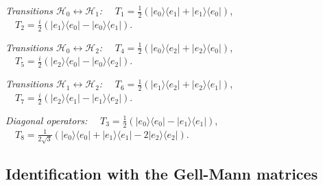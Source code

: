 \medskip
\textit{Transitions $\mathcal{H}_0\leftrightarrow\mathcal{H}_1$:}
$\quad T_1 = \tfrac{1}{2}(|e_0\rangle\langle e_1|+|e_1\rangle\langle e_0|)$,
$\quad T_2 = \tfrac{i}{2}(|e_1\rangle\langle e_0|-|e_0\rangle\langle e_1|)$.

\textit{Transitions $\mathcal{H}_0\leftrightarrow\mathcal{H}_2$:}
$\quad T_4 = \tfrac{1}{2}(|e_0\rangle\langle e_2|+|e_2\rangle\langle e_0|)$,
$\quad T_5 = \tfrac{i}{2}(|e_2\rangle\langle e_0|-|e_0\rangle\langle e_2|)$.

\textit{Transitions $\mathcal{H}_1\leftrightarrow\mathcal{H}_2$:}
$\quad T_6 = \tfrac{1}{2}(|e_1\rangle\langle e_2|+|e_2\rangle\langle e_1|)$,
$\quad T_7 = \tfrac{i}{2}(|e_2\rangle\langle e_1|-|e_1\rangle\langle e_2|)$.

\textit{Diagonal operators:}
$\quad T_3 = \tfrac{1}{2}(|e_0\rangle\langle e_0|-|e_1\rangle\langle e_1|)$,
$\quad T_8 = \tfrac{1}{2\sqrt{3}}(|e_0\rangle\langle e_0|+|e_1\rangle\langle e_1|-2|e_2\rangle\langle e_2|)$.

\subsection{Identification with the Gell-Mann matrices}

